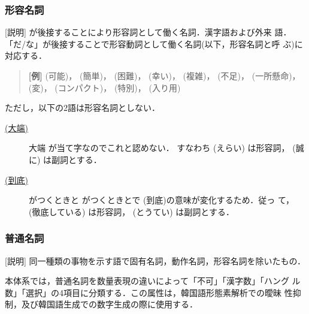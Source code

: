         
\subsubsection{形容名詞}        

[説明] 
が後接することにより形容詞として働く名詞．漢字語および外来
語．「だ/な」が後接することで形容動詞として働く名詞(以下，形容名詞と呼
ぶ)に対応する．

\begin{quote}        
{\bf [例]}
(可能)，
(簡単)，
(困難)，
(幸い)，
(複雑)，
(不足)，
(一所懸命)，
(変)，
(コンパクト)，
(特別)，
(入り用)
\end{quote}

ただし，以下の2語は形容名詞としない．

\begin{description}
\item[\underline{
(大端)}] 
    大端 が当て字なのでこれと認めない．
    すなわち 
(えらい) は形容詞，
(誠に) は副詞とする．

\item[\underline{
(到底)}] 
がつくときと 
がつくときとで
(到底)の意味が変化するため．従っ
て，
(徹底している) は形容詞，
(とうてい) は副詞とする．
\end{description}


\subsubsection{普通名詞}
[説明] 同一種類の事物を示す語で固有名詞，動作名詞，形容名詞を除いたもの．

本体系では，普通名詞を数量表現の違いによって「不可」「漢字数」「ハング
ル数」「選択」の4項目に分類する．この属性は，韓国語形態素解析での曖昧
性抑制，及び韓国語生成での数字生成の際に使用する．


